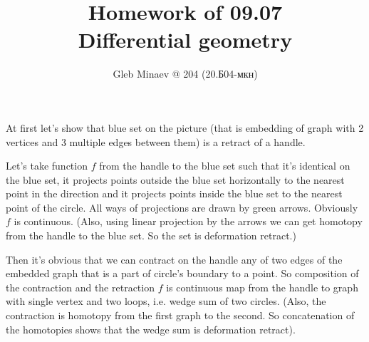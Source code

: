 \documentclass[12pt,a4paper]{article}
\title{Homework of 09.07\\Differential geometry}
\author{Gleb Minaev @ 204 (20.Б04-мкн)}
\begin{document}
    \maketitle

    \setcounter{enumprb}{6}

    \begin{enumproblem}
        At first let's show that blue set on the picture (that is embedding of graph with 2 vertices and 3 multiple edges between them) is a retract of a handle.
        \begin{figure}[H]
            \centering
        \end{figure}
        Let's take function $f$ from the handle to the blue set such that it's identical on the blue set, it projects points outside the blue set horizontally to the nearest point in the direction and it projects points inside the blue set to the nearest point of the circle. All ways of projections are drawn by green arrows. Obviously $f$ is continuous. (Also, using linear projection by the arrows we can get homotopy from the handle to the blue set. So the set is deformation retract.)

        Then it's obvious that we can contract on the handle any of two edges of the embedded graph that is a part of circle's boundary to a point. So composition of the contraction and the retraction $f$ is continuous map from the handle to graph with single vertex and two loops, i.e. wedge sum of two circles. (Also, the contraction is homotopy from the first graph to the second. So concatenation of the homotopies shows that the wedge sum is deformation retract).
    \end{enumproblem}
\end{document}
